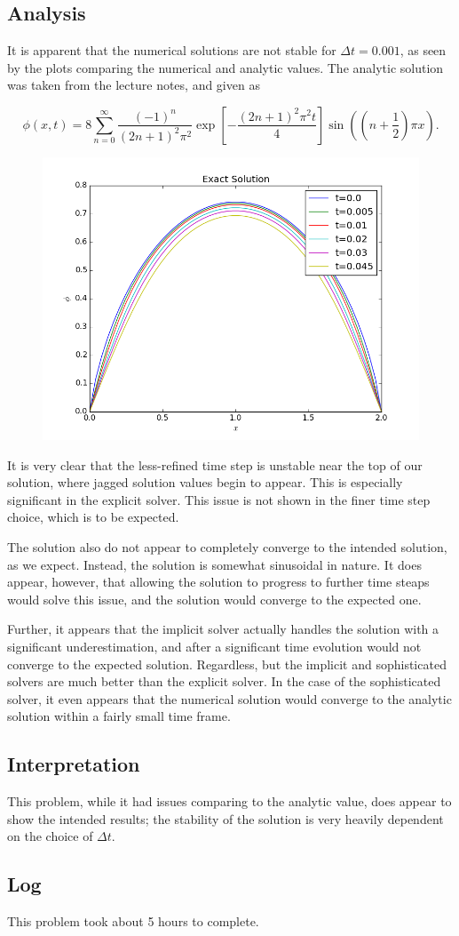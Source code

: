 \documentclass[10pt,letter]{article}
\begin{document}
\pagebreak
\pagebreak
\subsection{Analysis}

It is apparent that the numerical solutions are not stable for $\Delta t = 0.001$, as seen by the plots comparing the numerical and analytic values. The analytic solution was taken from the lecture notes, and given as

$$\phi(x,t) = 8\sum_{n=0}^{\infty} \frac{(-1)^n}{(2n+1)^2\pi^2}\exp{\left[-\frac{(2n+1)^2\pi^2t}{4}\right]}\sin{((n+\frac{1}{2})\pi x)} .$$

\begin{figure}[H]
  \centering
    \includegraphics[width=.6\textwidth]{homework7_problem2_plot-1}
\end{figure}

It is very clear that the less-refined time step is unstable near the top of our solution, where jagged solution values begin to appear. This is especially significant in the explicit solver. This issue is not shown in the finer time step choice, which is to be expected.

The solution also do not appear to completely converge to the intended solution, as we expect. Instead, the solution is somewhat sinusoidal in nature. It does appear, however, that allowing the solution to progress to further time steaps would solve this issue, and the solution would converge to the expected one.

Further, it appears that the implicit solver actually handles the solution with a significant underestimation, and after a significant time evolution would not converge to the expected solution. Regardless, but the implicit and sophisticated solvers are much better than the explicit solver. In the case of the sophisticated solver, it even appears that the numerical solution would converge to the analytic solution within a fairly small time frame.

\subsection{Interpretation}

This problem, while it had issues comparing to the analytic value, does appear to show the intended results; the stability of the solution is very heavily dependent on the choice of $\Delta t$.
 
\subsection{Log}

This problem took about 5 hours to complete.
\end{document}
